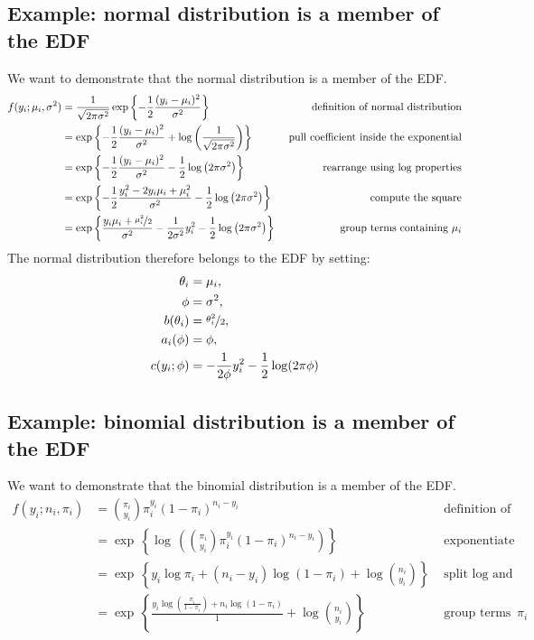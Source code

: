     \subsection{Example: normal distribution is a member of the EDF}
      We want to demonstrate that the normal distribution is a member of the EDF.
      \begin{align*}
      f(y_i; \mu_i, \sigma^2)
        &= \frac{1}{\sqrt{2\pi\sigma^2}} \exp\left\{-\frac{1}{2} \frac{(y_i-\mu_i)^2}{\sigma^2}\right\}
        & \text{ definition of normal distribution}\\
        &= \exp\left\{-\frac{1}{2} \frac{(y_i-\mu_i)^2}{\sigma^2} + \log\left(\frac{1}{\sqrt{2\pi\sigma^2}}\right)\right\}
        & \text{ pull coefficient inside the exponential}\\
        &= \exp\left\{-\frac{1}{2} \frac{(y_i-\mu_i)^2}{\sigma^2} -\frac{1}{2}\log\left(2\pi\sigma^2\right)\right\}
        & \text{ rearrange using log properties}\\
        &= \exp\left\{-\frac{1}{2} \frac{y_i^2-2y_i\mu_i+\mu_i^2}{\sigma^2} -\frac{1}{2}\log\left(2\pi\sigma^2\right)\right\}
        & \text{ compute the square}\\
        &= \exp\left\{\frac{y_i\mu_i+\nicefrac{\mu_i^2}{2}}{\sigma^2} - \frac{1}{2\sigma^2}y_i^2 - \frac{1}{2}\log\left(2\pi\sigma^2\right)\right\}
        & \text{ group terms containing } \mu_i\\
      \end{align*}
      The normal distribution therefore belongs to the EDF by setting:
      \begin{align*}
        \theta_i     &= \mu_i, \\
        \phi         &= \sigma^2, \\
        b(\theta_i)  &= \nicefrac{\theta_i^2}{2}, \\
        a_i(\phi)    &= \phi, \\
        c(y_i; \phi) &= - \frac{1}{2\phi} y_i^2 - \frac{1}{2}\log(2\pi\phi)
      \end{align*}

    \subsection{Example: binomial distribution is a member of the EDF}
      We want to demonstrate that the binomial distribution is a member of the EDF.
      \begin{align*}
      f(y_i; n_i, \pi_i)
        &= \binom{\pi_i}{y_i}\pi_i^{y_i}(1-\pi_i)^{n_i-y_i}
        & \text{ definition of binomial distribution}\\
        &= \exp\,\left\{\log\,\left(\binom{\pi_i}{y_i}\pi_i^{y_i}(1-\pi_i)^{n_i-y_i}\right)\right\}
        & \text{ exponentiate to compare with EDF} \\
        &= \exp\,\left\{y_i\log\pi_i+(n_i-y_i)\log(1-\pi_i)+\log\binom{n_i}{y_i}\right\}
        & \text{ split log and simplify}\\
        &= \exp\,\left\{\frac{y_i\log\left(\frac{\pi_i}{1-\pi_i}\right)+n_i\log(1-\pi_i)}{1}+\log\binom{n_i}{y_i}\right\}
        & \text{ group terms containing } \pi_i\\
      \end{align*}
      
